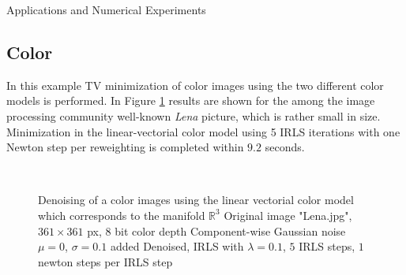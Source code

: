\begin{chapter}{Applications and Numerical Experiments}
\FloatBarrier
\subsection{Color} %
\label{sub:Color}
In this example TV minimization of color images using the two different color models is performed. In Figure \ref{fig:application_color1} results are shown for the among the image processing community well-known \emph{Lena} picture, which is rather small in size. Minimization in
the linear-vectorial color model using 5 IRLS iterations with one Newton step per reweighting is completed within $9.2$ seconds.\\

\begin{figure}[h!]
    \centering
    \\
    \caption[Color image "Lena" linear vectorial denoising]{Denoising of a color images using the linear vectorial color model which corresponds to the manifold $\mathbb{R}^3$
	 Original image "Lena.jpg", $361\times 361$ px, 8 bit color depth
	 Component-wise Gaussian noise $\mu=0$, $\sigma=0.1$ added
	 Denoised, IRLS with $\lambda=0.1$, $5$ IRLS steps, $1$ newton steps per IRLS step
	\label{fig:application_color1}
    }
\end{figure}


\end{chapter}
